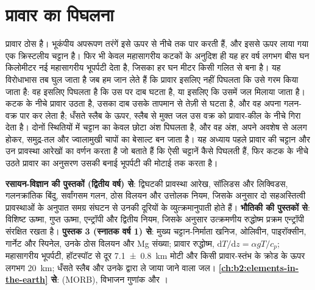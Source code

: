 \chapter{प्रावार का पिघलना}\label{ch:b2:mantle-melting}

प्रावार ठोस है। भूकंपीय अपरूपण तरंगें इसे ऊपर से नीचे तक पार करती हैं, और
इससे ऊपर लाया गया  एक क्रिस्टलीय चट्टान है। फिर भी केवल महासागरीय कटकों के
अनुदिश ही यह हर वर्ष लगभग बीस घन किलोमीटर नई महासागरीय भूपर्पटी देता है,
जिसका हर घन मीटर किसी गलित से बना है। यह विरोधाभास तब घुल जाता है जब हम जान लेते हैं
कि प्रावार इसलिए नहीं पिघलता कि उसे गरम किया जाता है: वह इसलिए पिघलता है कि
उस पर दाब घटता है, या इसलिए कि उसमें जल मिलाया जाता है। कटक के नीचे
प्रावार उठता है, उसका दाब उसके तापमान से तेज़ी से घटता है, और वह अपना
गलन-वक्र पार कर लेता है; धँसते स्लैब के ऊपर, स्लैब से मुक्त जल उस
वक्र को प्रावार-कील के नीचे गिरा देता है। दोनों स्थितियों में चट्टान का केवल छोटा अंश
पिघलता है, और वह अंश, अपने अवशेष से अलग होकर, समुद्र-तल और
ज्वालामुखी चापों का बेसाल्ट बन जाता है। यह अध्याय पहले प्रावार की
चट्टान और उन प्रावस्था आरेखों का वर्णन करता है जो बताते हैं कि ऐसी चट्टानें कैसे पिघलती हैं, फिर
कटक के नीचे उठते प्रावार का अनुसरण उसकी बनाई भूपर्पटी की मोटाई तक करता है।

\begin{recall}
\textbf{रसायन-विज्ञान की पुस्तकों (द्वितीय वर्ष) से}: द्विघटकी प्रावस्था आरेख,
सॉलिडस और लिक्विडस, गलनक्रांतिक बिंदु, सर्वांगसम गलन, ठोस विलयन
और उत्तोलक नियम, जिसके अनुसार दो सहअस्तित्वी प्रावस्थाओं के अनुपात
समग्र संघटन से उनकी दूरियों के व्युत्क्रमानुपाती होते हैं।
\textbf{भौतिकी की पुस्तकों से}: विशिष्ट ऊष्मा, गुप्त ऊष्मा, एन्ट्रॉपी
और द्वितीय नियम, जिसके अनुसार उत्क्रमणीय रुद्धोष्म प्रक्रम एन्ट्रॉपी संरक्षित रखता है।
\textbf{पुस्तक 3 (स्नातक वर्ष 1) से}: मुख्य चट्टान-निर्माता खनिज, ओलिवीन,
पाइरॉक्सीन, गार्नेट और स्पिनेल, उनके ठोस विलयन और Mg संख्या;
प्रावार रुद्धोष्म, $\mathrm dT/\mathrm dz = \alpha gT/c_p$; महासागरीय भूपर्पटी,
हॉटस्पॉट से दूर \qty[uncertainty-mode=separate]{7.1 \pm 0.8}{km} मोटी और
किसी प्रावार-स्तंभ के क्रोड के ऊपर लगभग \qty{20}{km}; धँसते स्लैब और उनके द्वारा
ले जाया जाने वाला जल। \textbf{\cref{ch:b2:elements-in-the-earth} से}: 
(MORB), विभाजन गुणांक और ।
\end{recall}

